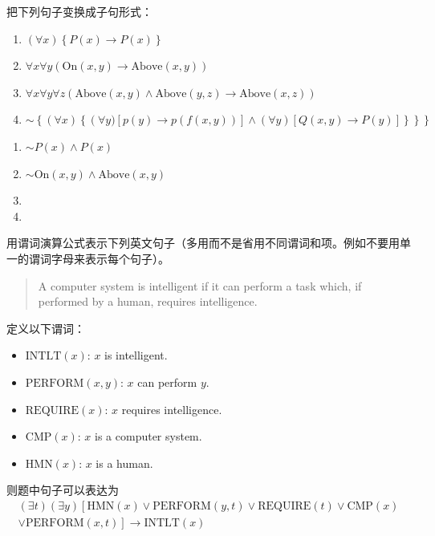 \begin{question}
把下列句子变换成子句形式：
	\begin{enumerate}
         \item $\left(\forall x\right) \left\{P\left(x\right) \to P\left(x\right)\right\}$
         \item $\forall x \forall y \left(\mathrm{On} \left(x,y\right) \to \mathrm{Above} \left(x,y\right) \right)$
         \item $\forall x \forall y \forall z \left(\mathrm{Above} \left(x,y\right) \wedge \mathrm{Above}\left(y,z\right) \to \mathrm{Above}\left(x,z\right) \right)$ 
         \item $\sim\left\{\left(\forall x\right)\left\{\left(\forall y)\left[p\left(y\right) \to p(f(x,y))\right] \wedge \left(\forall y \right) \left[Q(x,y) \to P(y) \right]\right\}\right\}\right\}$
	\end{enumerate}
\end{question}
\begin{solution}
	\begin{enumerate}
		\item $\sim P(x) \wedge P(x)$
		\item $\sim \mathrm{On}(x,y) \wedge \mathrm{Above}(x,y)$
		\item 
		\item 
	\end{enumerate}
\end{solution}

\begin{question}
用谓词演算公式表示下列英文句子（多用而不是省用不同谓词和项。例如不要用单一的谓词字母来表示每个句子）。
	\begin{quote}
		A computer system is intelligent if it can perform a task which, if performed by a human, requires intelligence. 
	\end{quote}
\end{question}
\begin{solution}
定义以下谓词：
	\begin{itemize}
		\item $\mathrm{INTLT}(x)$:	$x$ is intelligent.
		\item $\mathrm{PERFORM}(x,y)$:	$x$ can perform $y$.
		\item $\mathrm{REQUIRE}(x)$:		$x$ requires intelligence.
		\item $\mathrm{CMP}(x)$:		$x$ is a computer system.
		\item $\mathrm{HMN}(x)$:		$x$ is a human.
	\end{itemize} \par
则题中句子可以表达为
	\begin{multline*}
	\left( \exists t \right) \left( \exists y \right)
	\left[ \mathrm{HMN}(x) \vee \mathrm{PERFORM}(y,t) \vee \mathrm{REQUIRE}(t)
	\vee \mathrm{CMP}(x) \right. \\
	\left. \vee \mathrm{PERFORM}(x,t) \right] 
	\to \mathrm{INTLT}(x)
	\end{multline*}
\end{solution}

